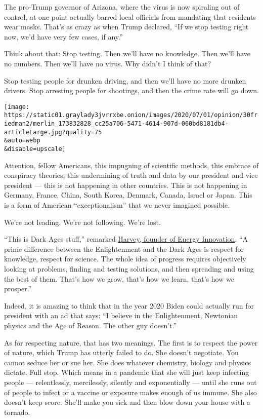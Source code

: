 The pro-Trump governor of Arizona, where the virus is now spiraling out
of control, at one point actually barred local officials from mandating
that residents wear masks. That's as crazy as when Trump declared, ``If
we stop testing right now, we'd have very few cases, if any.''

Think about that: Stop testing. Then we'll have no knowledge. Then we'll
have no numbers. Then we'll have no virus. Why didn't I think of that?

Stop testing people for drunken driving, and then we'll have no more
drunken drivers. Stop arresting people for shootings, and then the crime
rate will go down.

\texttt{[image: https://static01.graylady3jvrrxbe.onion/images/2020/07/01/opinion/30friedman2/merlin\_173832828\_cc25a706-5471-4614-907d-060bd8181db4-articleLarge.jpg?quality=75\\\&auto=webp\\\&disable=upscale]}

Attention, fellow Americans, this impugning of scientific methods, this
embrace of conspiracy theories, this undermining of truth and data by
our president and vice president --- this is not happening in other
countries. This is not happening in Germany, France, China, South Korea,
Denmark, Canada, Israel or Japan. This is a form of American
``exceptionalism'' that we never imagined possible.

We're not leading. We're not following. We're lost.

``This is Dark Ages stuff,'' remarked
\href{https://energyinnovation.org/team-member/hal-harvey/}{Harvey,
founder of Energy Innovation}. ``A prime difference between the
Enlightenment and the Dark Ages is respect for knowledge, respect for
science. The whole idea of progress requires objectively looking at
problems, finding and testing solutions, and then spreading and using
the best of them. That's how we grow, that's how we learn, that's how we
prosper.''

Indeed, it is amazing to think that in the year 2020 Biden could
actually run for president with an ad that says: ``I believe in the
Enlightenment, Newtonian physics and the Age of Reason. The other guy
doesn't.''

As for respecting nature, that has two meanings. The first is to respect
the power of nature, which Trump has utterly failed to do. She doesn't
negotiate. You cannot seduce her or sue her. She does whatever
chemistry, biology and physics dictate. Full stop. Which means in a
pandemic that she will just keep infecting people --- relentlessly,
mercilessly, silently and exponentially --- until she runs out of people
to infect or a vaccine or exposure makes enough of us immune. She also
doesn't keep score. She'll make you sick and then blow down your house
with a tornado.

